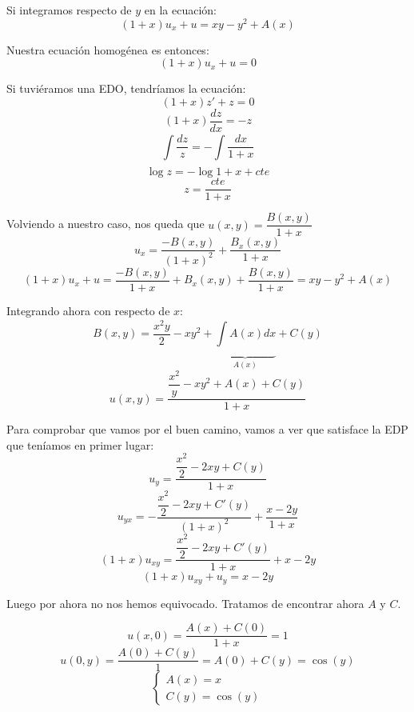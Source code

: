 \documentclass[openany]{book}
\begin{document}
\begin{exercise}
 $  $\\
 Si integramos respecto de $ y $ en la ecuación:
 $$ (1+x)u_{x} + u = xy - y^2 + A(x) $$

 Nuestra ecuación homogénea es entonces:
 $$ (1+x)u_{x} +u = 0 $$

 Si tuviéramos una EDO, tendríamos la ecuación:
 $$ (1+x)z'+z = 0 $$
 $$ (1+x)\dfrac{dz}{dx} = -z $$
 $$ \int\limits_{}^{}\dfrac{dz}{z} = - \int\limits_{}^{}\dfrac{dx}{1+x} $$
 $$ \log{z} = -\log{1+x} +cte $$
 $$ z = \dfrac{cte}{1+x} $$

 Volviendo a nuestro caso, nos queda que $ u(x,y) = \dfrac{B(x,y)}{1+x} $
 $$ u_{x} = \dfrac{-B(x,y)}{(1+x)^2} + \dfrac{B_{x}(x,y)}{1+x} $$
 $$ (1+x)u_{x}+u = \dfrac{-B(x,y)}{1+x} + B_{x}(x,y) + \dfrac{B(x,y)}{1+x} = xy-y^2+A(x) $$

 Integrando ahora con respecto de $ x $:
 $$ B(x,y) = \dfrac{x^2y}{2}-xy^2+ \underbrace{ \int\limits_{}^{}A(x)dx}_{A(x)} + C(y) $$
 $$ u(x,y) = \dfrac{\dfrac{x^2}{y}-xy^2+A(x)+C(y)}{1+x} $$

 Para comprobar que vamos por el buen camino, vamos a ver que satisface la EDP que teníamos en primer lugar:
 $$ u_{y} = \dfrac{\dfrac{x^2}{2}-2xy+C(y)}{1+x} $$
 $$ u_{yx} = - \dfrac{\dfrac{x^2}{2}-2xy+C'(y)}{(1+x)^2} + \dfrac{x-2y}{1+x} $$
 $$ (1+x)u_{xy} = \dfrac{\dfrac{x^2}{2}-2xy+C'(y)}{1+x} + x -2y $$
 $$ (1+x)u_{xy}+u_{y} = x-2y $$

 Luego por ahora no nos hemos equivocado. Tratamos de encontrar ahora $ A $ y $ C $.
 
 $$ u(x,0) = \dfrac{A(x)+C(0)}{1+x} = 1 $$
 $$ u(0,y) = \dfrac{A(0)+C(y)}{1} = A(0)+C(y) = \cos(y) $$
 $$ \left\{
 \begin{array}{l}
   A(x) = x\\ 
   C(y) = \cos(y)
 \end{array}
 \right. $$
\end{exercise}
\end{document}
